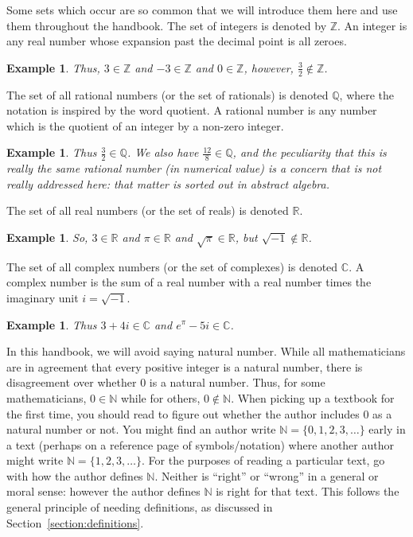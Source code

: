 \documentclass{book}
\newcounter{ekcounter}%
\theoremstyle{ekimcustom}
\newtheorem{example}[ekcounter]{Example}
\begin{document}
Some sets which occur are so common that we will introduce them here and use them throughout the handbook. The set of integers is denoted by $\mathbb{Z}$. An integer is any real number whose expansion past the decimal point is all zeroes.
\begin{example}
Thus, $3 \in \mathbb{Z}$ and $-3 \in \mathbb{Z}$ and $0 \in \mathbb{Z}$, however, $\frac{3}{2} \not\in \mathbb{Z}$.
\end{example}

The set of all rational numbers (or the set of rationals) is denoted $\mathbb{Q}$, where the notation is inspired by the word quotient. A rational number is any number which is the quotient of an integer by a non-zero integer.
\begin{example}
Thus $\frac{3}{2} \in \mathbb{Q}$. We also have $\frac{12}{8} \in \mathbb{Q}$, and the peculiarity that this is really the same rational number (in numerical value) is a concern that is not really addressed here: that matter is sorted out in abstract algebra.
\end{example}

The set of all real numbers (or the set of reals) is denoted $\mathbb{R}$.
\begin{example}
So, $3 \in \mathbb{R}$ and $\pi \in \mathbb{R}$ and $\sqrt{\pi} \in \mathbb{R}$, but $\sqrt{-1} \not\in \mathbb{R}$.
\end{example}
The set of all complex numbers (or the set of complexes) is denoted $\mathbb{C}$. A complex number is the sum of a real number with a real number times the imaginary unit $i=\sqrt{-1}$.
\begin{example}
Thus $3 + 4i \in \mathbb{C}$ and $e^{\pi} - 5i \in \mathbb{C}$.
\end{example}

In this handbook, we will avoid saying natural number. While all mathematicians are in agreement that every positive integer is a natural number, there is disagreement over whether $0$ is a natural number. Thus, for some mathematicians, $0 \in \mathbb{N}$ while for others, $0 \not\in \mathbb{N}$. When picking up a textbook for the first time, you should read to figure out whether the author includes $0$ as a natural number or not. You might find an author write $\mathbb{N} = \{0,1,2,3,\dots\}$ early in a text (perhaps on a reference page of symbols/notation) where another author might write $\mathbb{N} = \{1,2,3,\dots\}$. For the purposes of reading a particular text, go with how the author defines $\mathbb{N}$. Neither is ``right'' or ``wrong'' in a general or moral sense: however the author defines $\mathbb{N}$ is right for that text. This follows the general principle of needing definitions, as discussed in Section~\ref{section:definitions}.
\end{document}
